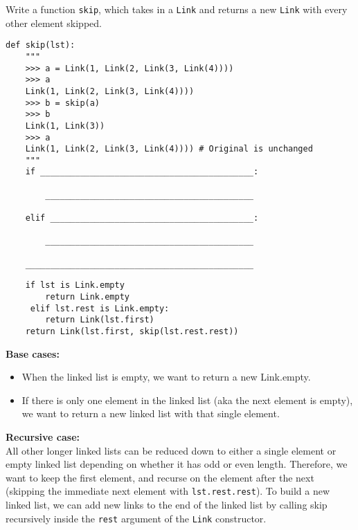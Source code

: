 \begin{blocksection}
\question Write a function \texttt{skip}, which takes in a \texttt{Link} and returns a new \texttt{Link} with every other element skipped.

\begin{lstlisting}
def skip(lst):
    """
    >>> a = Link(1, Link(2, Link(3, Link(4))))
    >>> a
    Link(1, Link(2, Link(3, Link(4))))
    >>> b = skip(a)
    >>> b
    Link(1, Link(3))
    >>> a
    Link(1, Link(2, Link(3, Link(4)))) # Original is unchanged
    """
    if ___________________________________________:

        __________________________________________

    elif _________________________________________:

        __________________________________________

    ______________________________________________
\end{lstlisting}
\begin{solution}[0.6in]
\begin{lstlisting}
    if lst is Link.empty
    	return Link.empty
     elif lst.rest is Link.empty:
        return Link(lst.first)
    return Link(lst.first, skip(lst.rest.rest))
\end{lstlisting}
\textbf{Base cases:}
\begin{itemize}
\item When the linked list is empty, we want to return a new Link.empty.
\item If there is only one element in the linked list (aka the next element is empty), we want to return a new linked list with that single element.
\end{itemize}
\textbf{Recursive case:} \\
All other longer linked lists can be reduced down to either a single element or empty linked list depending on whether it has odd or even length. Therefore, we want to keep the first element, and recurse on the element after the next (skipping the immediate next element with \lstinline{lst.rest.rest}). To build a new linked list, we can add new links to the end of the linked list by calling skip recursively inside the \lstinline{rest} argument of the \lstinline{Link} constructor.
\end{solution}
\end{blocksection}

